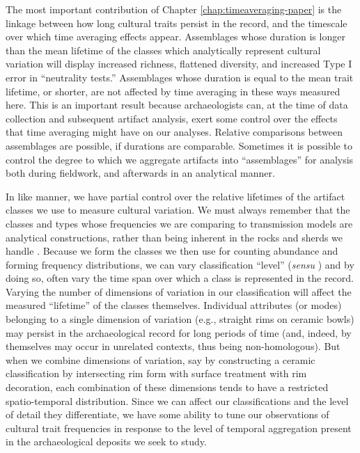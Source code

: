 The most important contribution of Chapter \ref{chap:timeaveraging-paper} is the linkage between how long cultural traits persist in the record, and the timescale over which time averaging effects appear.  Assemblages whose duration is longer than the mean lifetime of the classes which analytically represent cultural variation will display increased richness, flattened diversity, and increased Type I error in ``neutrality tests.''  Assemblages whose duration is equal to the mean trait lifetime, or shorter, are not affected by time averaging in these ways measured here.  This is an important result because archaeologists can, at the time of data collection and subsequent artifact analysis, exert some control over the effects that time averaging might have on our analyses.  Relative comparisons between assemblages are possible, if durations are comparable.  Sometimes it is possible to control the degree to which we aggregate artifacts into ``assemblages'' for analysis both during fieldwork, and afterwards in an analytical manner.  

In like manner, we have partial control over the relative lifetimes of the artifact classes we use to measure cultural variation.  We must always remember that the classes and types whose frequencies we are comparing to transmission models are analytical constructions, rather than being inherent in the rocks and sherds we handle \citep{Dunnell1971}.  Because we form the classes we then use for counting abundance and forming frequency distributions, we can vary classification ``level'' (\emph{sensu} \citealt{Dunnell1971}) and by doing so, often vary the time span over which a class is represented in the record.  Varying the number of dimensions of variation in our classification will affect the measured ``lifetime'' of the classes themselves.  Individual attributes (or modes) belonging to a single dimension of variation (e.g., straight rims on ceramic bowls) may persist in the archaeological record for long periods of time (and, indeed, by themselves may occur in unrelated contexts, thus being non-homologous).  But when we combine dimensions of variation, say by constructing a ceramic classification by intersecting rim form with surface treatment with rim decoration, each combination of these dimensions tends to have a restricted spatio-temporal distribution.  Since we can affect our classifications and the level of detail they differentiate, we have some ability to tune our observations of cultural trait frequencies in response to the level of temporal aggregation present in the archaeological deposits we seek to study.  

